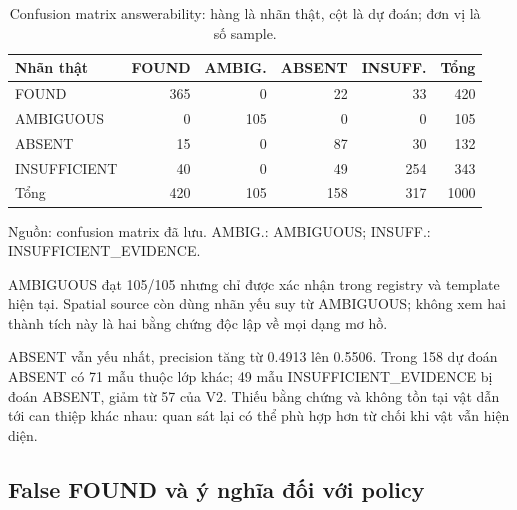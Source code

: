 \begin{table}[htbp]
    \centering
    \setlength{\tabcolsep}{4pt}
    \renewcommand{\arraystretch}{1.15}
    \caption{Confusion matrix answerability: hàng là nhãn thật,
    cột là dự đoán; đơn vị là số sample.}
    \label{tab:results-answerability-confusion}
    \small
    \begin{tabularx}{\textwidth}{@{}>{\raggedright\arraybackslash}Xrrrrr@{}}
        \toprule
        Nhãn thật & FOUND & AMBIG. & ABSENT & INSUFF. & Tổng \\
        \midrule
        FOUND & 365 & 0 & 22 & 33 & 420 \\
        AMBIGUOUS & 0 & 105 & 0 & 0 & 105 \\
        ABSENT & 15 & 0 & 87 & 30 & 132 \\
        INSUFFICIENT & 40 & 0 & 49 & 254 & 343 \\
        \midrule
        Tổng & 420 & 105 & 158 & 317 & 1000 \\
        \bottomrule

    \end{tabularx}
    \vspace{2pt}
    {\footnotesize\raggedright Nguồn: confusion matrix đã lưu.
    AMBIG.: AMBIGUOUS; INSUFF.: INSUFFICIENT\_EVIDENCE.\par}
\end{table}

AMBIGUOUS đạt 105/105 nhưng chỉ được xác nhận trong
registry và template hiện tại. Spatial source còn
dùng nhãn yếu suy từ AMBIGUOUS; không xem hai thành
tích này là hai bằng chứng độc lập về mọi dạng mơ hồ.

ABSENT vẫn yếu nhất, precision tăng từ 0.4913 lên 0.5506. Trong 158 dự đoán ABSENT có 71 mẫu thuộc lớp khác; 49 mẫu INSUFFICIENT\_EVIDENCE bị đoán ABSENT, giảm từ 57 của V2. Thiếu bằng chứng và không tồn tại vật
dẫn tới can thiệp khác nhau: quan sát lại có thể
phù hợp hơn từ chối khi vật vẫn hiện diện.

\subsection{False FOUND và ý nghĩa đối với policy}


